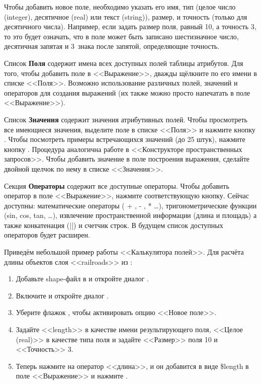 Чтобы добавить новое поле, необходимо указать его имя, тип (целое число
(integer), десятичное (real) или текст (string)), размер, и точность
(только для десятичного числа). Например, если задать размер поля, равный
10, а точность 3, то это будет означать, что в поле может быть записано
шестизначное число, десятичная запятая и 3~знака после запятой, определяющие
точность.

Список \textbf{Поля} содержит имена всех доступных полей таблицы атрибутов.
Для того, чтобы добавить поле в <<Выражение>>, дважды щёлкните по его имени
в списке <<Поля>>. Возможно использование различных полей, значений и
операторов для создания выражений (их также можно просто напечатать в
поле <<Выражение>>).

Список \textbf{Значения} содержит значения атрибутивных полей. Чтобы
просмотреть все имеющиеся значения, выделите поле в списке <<Поля>> и
нажмите кнопку  .
Чтобы посмотреть примеры встречающихся значений (до 25 штук), нажмите
кнопку  .
Процедура аналогична работе в <<Конструкторе пространственных запросов>>.
Чтобы добавить значение в поле построения выражения, сделайте двойной
щелчок по нему в списке <<Значения>>.

Секция \textbf{Операторы} содержит все доступные операторы. Чтобы добавить
оператор в поле <<Выражение>>, нажмите соответствующую кнопку. Сейчас
доступны: математические операторы ( + , - , * \ldots), тригонометрические
функции (sin, cos, tan, \ldots), извлечение пространственной информации
(длина и площадь) а также конкатенация (||) и счетчик строк. В будущем
список доступных операторов будет расширен.

Приведём небольшой пример работы <<Калькулятора полей>>. Для расчёта
длины объектов слоя <<railroads>> из :

\begin{enumerate}
\item Добавьте shape-файл  в \qg и откройте
диалог .
\item Включите  и
откройте диалог .
\item Уберите флажок , чтобы активировать
опцию <<Новое поле>>.
\item Задайте <<length>> в качестве имени результирующего поля, <<Целое (real)>>
в качестве типа поля и задайте <<Размер>> поля 10 и <<Точность>> 3.
\item Теперь нажмите на оператор <<длина>>, и он добавится в виде \$length в
поле <<Выражение>> и нажмите .
\end{enumerate}

